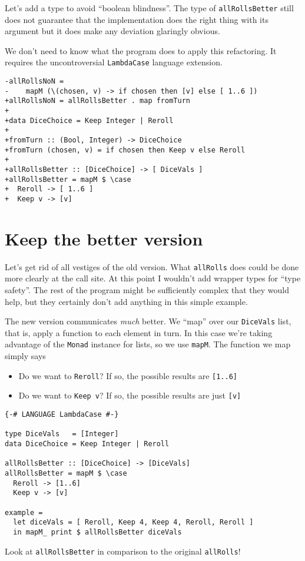 Let's add a type to avoid ``boolean blindness''. The type of \texttt{allRollsBetter} still does not guarantee that the implementation does the right thing with its argument but it does make any deviation glaringly obvious.

We don't need to know what the program does to apply this refactoring. It requires the uncontroversial \texttt{LambdaCase} language extension.

\begin{verbatim}
-allRollsNoN =
-    mapM (\(chosen, v) -> if chosen then [v] else [ 1..6 ])
+allRollsNoN = allRollsBetter . map fromTurn
+
+data DiceChoice = Keep Integer | Reroll
+
+fromTurn :: (Bool, Integer) -> DiceChoice
+fromTurn (chosen, v) = if chosen then Keep v else Reroll
+
+allRollsBetter :: [DiceChoice] -> [ DiceVals ]
+allRollsBetter = mapM $ \case
+  Reroll -> [ 1..6 ]
+  Keep v -> [v]
\end{verbatim}


\section{Keep the better version}


Let's get rid of all vestiges of the old version. What \texttt{allRolls} does could be done more clearly at the call site. At this point I wouldn't add wrapper types for ``type safety''. The rest of the program might be sufficiently complex that they would help, but they certainly don't add anything in this simple example.

The new version communicates \textit{much} better. We ``map'' over our \texttt{DiceVals} list, that is, apply a function to each element in turn. In this case we're taking advantage of the \texttt{Monad} instance for lists, so we use \texttt{mapM}. The function we map simply says

\begin{itemize}
\item Do we want to \texttt{Reroll}? If so, the possible results are \texttt{[1..6]}  
\item Do we want to \texttt{Keep v}? If so, the possible results are just \texttt{[v]}
\end{itemize}


\begin{verbatim}
{-# LANGUAGE LambdaCase #-}

type DiceVals   = [Integer]
data DiceChoice = Keep Integer | Reroll

allRollsBetter :: [DiceChoice] -> [DiceVals]
allRollsBetter = mapM $ \case
  Reroll -> [1..6]
  Keep v -> [v]

example =
  let diceVals = [ Reroll, Keep 4, Keep 4, Reroll, Reroll ]
  in mapM_ print $ allRollsBetter diceVals
\end{verbatim}
Look at \texttt{allRollsBetter} in comparison to the original \texttt{allRolls}!

